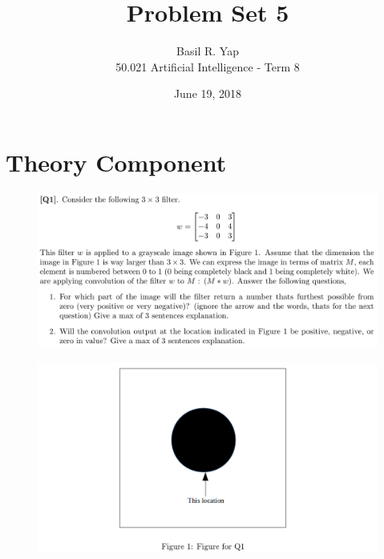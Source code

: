 \documentclass[12pt]{article}
\begin{document}
 
 
\title{Problem Set 5}%
\author{Basil R. Yap\\ %
50.021 Artificial Intelligence - Term 8} %
\date{June 19, 2018}
\maketitle

\section{Theory Component}
\begin{figure}[h!]
\includegraphics[width=\linewidth]{./assets/201806300414.png}
\end{figure}
\pagebreak
\begin{figure}[h!]
\includegraphics[width=\linewidth]{./assets/201806300418.png}
\end{figure}
\end{document}
